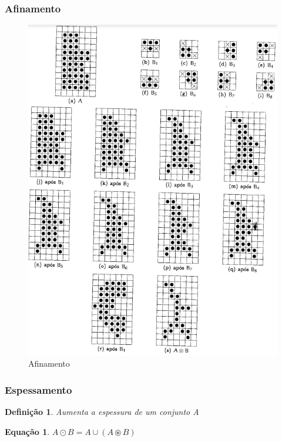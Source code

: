 \documentclass[aspectratio=169]{beamer}
\theoremstyle{Definition}
\newtheorem{defn}{Defini\c c\~ao}
\newtheorem{eq}[theorem]{Equa\c c\~ao}
\begin{document}
\begin{frame}
	\frametitle{Afinamento}
	
	\begin{figure}[h]
	 	\includegraphics[width=0.6\paperwidth,height=0.6\paperheight]{imagens/afinamento}
		\caption{Afinamento}\label{figThinn}
	\end{figure}
	
\end{frame}

\begin{frame}
	\frametitle{Espessamento}
	
	\begin{defn}
		Aumenta a espessura de um conjunto A
	\end{defn}
	
	\begin{eq}
			$ A \odot B = A \cup (A \circledast B) $
	\end{eq}
	
\end{frame}
\end{document}
